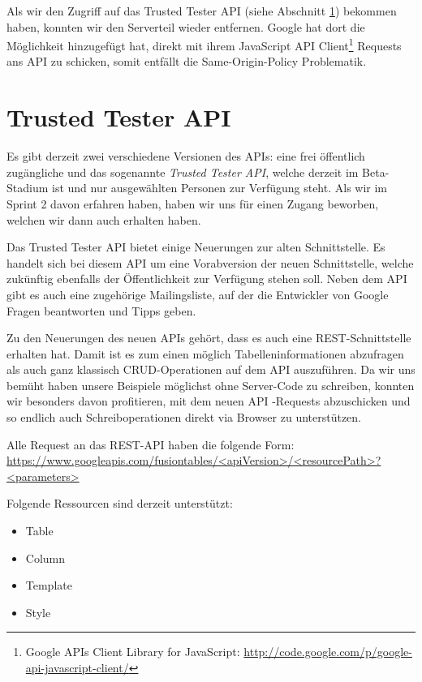 Als wir den Zugriff auf das Trusted Tester \gls{API} (siehe Abschnitt \ref{trusted-tester-api}) bekommen haben, konnten wir den Serverteil wieder entfernen. Google hat dort die Möglichkeit hinzugefügt hat, direkt mit ihrem JavaScript \gls{API} Client\footnote{Google APIs Client Library for JavaScript: \url{http://code.google.com/p/google-api-javascript-client/}} Requests ans \gls{API} zu schicken, somit entfällt die Same-Origin-Policy Problematik.

\section{Trusted Tester API}
\label{trusted-tester-api}
Es gibt derzeit zwei verschiedene Versionen des \gls{API}s: eine frei öffentlich zugängliche und das sogenannte \emph{Trusted Tester \gls{API}}, welche derzeit im Beta-Stadium ist und nur ausgewählten Personen zur Verfügung steht. Als wir im Sprint 2 davon erfahren haben, haben wir uns für einen Zugang beworben, welchen wir dann auch erhalten haben.

Das Trusted Tester \gls{API} bietet einige Neuerungen zur alten Schnittstelle. Es handelt sich bei diesem \gls{API} um eine Vorabversion der neuen Schnittstelle, welche zukünftig ebenfalls der Öffentlichkeit zur Verfügung stehen soll. Neben dem \gls{API} gibt es auch eine zugehörige Mailingsliste, auf der die Entwickler von Google Fragen beantworten und Tipps geben.

Zu den Neuerungen des neuen \gls{API}s gehört, dass es auch eine \gls{REST}-Schnittstelle erhalten hat. Damit ist es zum einen möglich Tabelleninformationen abzufragen als auch ganz klassisch CRUD-Operationen auf dem \gls{API} auszuführen. Da wir uns bemüht haben unsere Beispiele möglichst ohne Server-Code zu schreiben, konnten wir besonders davon profitieren, mit dem neuen \gls{API} -Requests abzuschicken und so endlich auch Schreiboperationen direkt via Browser zu unterstützen.

Alle Request an das \gls{REST}-\gls{API} haben die folgende Form: \\
\url{https://www.googleapis.com/fusiontables/<apiVersion>/<resourcePath>?<parameters>}

Folgende Ressourcen sind derzeit unterstützt:
\begin{itemize}
	\item Table
	\item Column
	\item Template
	\item Style
\end{itemize}

